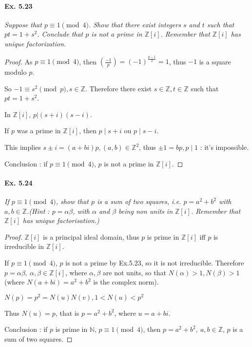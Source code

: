 \documentclass[11pt,a4paper]{article}
\newcommand{\Z}{\mathbb{Z}}
\newcommand{\legendre}[2]{\genfrac{(}{)}{}{}{#1}{#2}}
\begin{document}
\paragraph{Ex. 5.23}

{\it Suppose that $p \equiv 1 \pmod 4$. Show that there exist integers $s$ and $t$ such that $pt = 1 + s^2$.  Conclude that $p$ is not a prime in $\Z[i]$. Remember that $\Z[i]$ has unique factorization.
}

\begin{proof}
As  $p \equiv 1 \pmod 4$, then $\legendre{-1}{p} = (-1)^{\frac{p-1}{2}} = 1$, thus $-1$ is a square modulo $p$.
 
 So  $-1 \equiv s^2 \pmod p,  s \in \mathbb{Z}$. Therefore
  there exist $s \in \mathbb{Z}, t \in \mathbb{Z}$ such that $pt = 1+s^2$.
 
In $\mathbb{Z}[i]$, $p \vert (s+i)(s-i)$.

 If $p$ was a prime in $\mathbb{Z}[i]$, then  $p \mid s+i$ ou $p \mid s-i$.
  
 This implies $s \pm i = (a+bi)p, (a,b) \in \mathbb{Z}^2$, thus $\pm1 = b p , p\mid 1$ : it's impossible.
 
Conclusion : if $p \equiv 1\pmod 4$, $p$ is not a prime in  $\mathbb{Z}[i]$.
\end{proof}

\paragraph{Ex. 5.24}

{\it If $p \equiv 1 \pmod 4$, show that $p$ is a sum of two squares, i.e. $p = a^2 + b^2$ with $a, b \in \Z$.(Hint : $p = \alpha \beta$, with $ \alpha$ and $\beta$ being non units in $\Z[i]$. Remember that $\Z[i]$ has unique factorisation.)
}

\begin{proof}
$\Z[i]$ is a principal ideal domain, thus  $p$ is prime in $ \Z[i]$  iff $p$ is irreducible in $ \Z[i]$.
 
If $p \equiv 1\pmod 4$, $p$ is not a prime by Ex.5.23, so it is not irreducible. Therefore
$p = \alpha \beta, \ \alpha,\beta \in \mathbb{Z}[i]$, where $\alpha, \beta$ are not units, so that $N(\alpha)>1, N(\beta)>1$ (where $N(a+bi) = a^2 + b^2$ is the complex norm).

$N(p) = p^2=  N(u) N(v), 1 < N(u) < p^2$

Thus $N(u) = p$, that is  $p = a^2+b^2$, where $u = a+bi$.

Conclusion : if $p$ is prime in $\mathbb{N}$, $p \equiv 1\pmod 4$, then $p = a^2+b^2,\ a,b \in \Z$, $p$ is a sum of two squares.

\end{proof}
\end{document}
